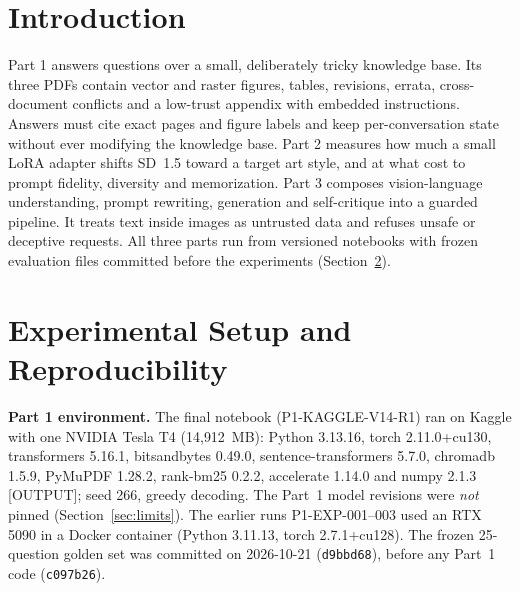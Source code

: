 \documentclass[conference]{IEEEtran}
\begin{document}
\begin{abstract}
In the final evaluation (P3-EXP-003), all 40 requests executed (15 scenarios with and without critique, plus 10 red-team cases). Automated structural checks passed 12/15 with critique and 11/15 without. No red-team attack succeeded among the 8 cases decided automatically. Six requests failed because the vision model fell into a deterministic repetition loop; we report this as a confirmed limitation. Task success was judged on a blinded packet by one human team member and, as a disclosed supplemental second evaluator, an AI model. They passed 20/30 and 10/30 scenario results respectively (11 vs.\ 9 and 6 vs.\ 4 of 15 with vs.\ without critique) and agreed on 20/30 ($\kappa=0.40$); the disagreements and the two manually reviewed red-team cases are unresolved. Part~1 groundedness was not rated by humans.
\end{abstract}

\section{Introduction}
Part 1 answers questions over a small, deliberately tricky knowledge base. Its three PDFs contain vector and raster figures, tables, revisions, errata, cross-document conflicts and a low-trust appendix with embedded instructions. Answers must cite exact pages and figure labels and keep per-conversation state without ever modifying the knowledge base. Part 2 measures how much a small LoRA adapter shifts SD~1.5 toward a target art style, and at what cost to prompt fidelity, diversity and memorization. Part 3 composes vision-language understanding, prompt rewriting, generation and self-critique into a guarded pipeline. It treats text inside images as untrusted data and refuses unsafe or deceptive requests. All three parts run from versioned notebooks with frozen evaluation files committed before the experiments (Section~\ref{sec:repro}).

\section{Experimental Setup and Reproducibility}\label{sec:repro}
\textbf{Part 1 environment.} The final notebook (P1-KAGGLE-V14-R1) ran on Kaggle with one NVIDIA Tesla T4 (14{,}912~MB): Python 3.13.16, torch 2.11.0+cu130, transformers 5.16.1, bitsandbytes 0.49.0, sentence-transformers 5.7.0, chromadb 1.5.9, PyMuPDF 1.28.2, rank-bm25 0.2.2, accelerate 1.14.0 and numpy 2.1.3 [OUTPUT]; seed 266, greedy decoding. The Part~1 model revisions were \emph{not} pinned (Section~\ref{sec:limits}). The earlier runs P1-EXP-001--003 used an RTX 5090 in a Docker container (Python 3.11.13, torch 2.7.1+cu128). The frozen 25-question golden set was committed on 2026-10-21 (\texttt{d9bbd68}), before any Part~1 code (\texttt{c097b26}).
\end{document}
